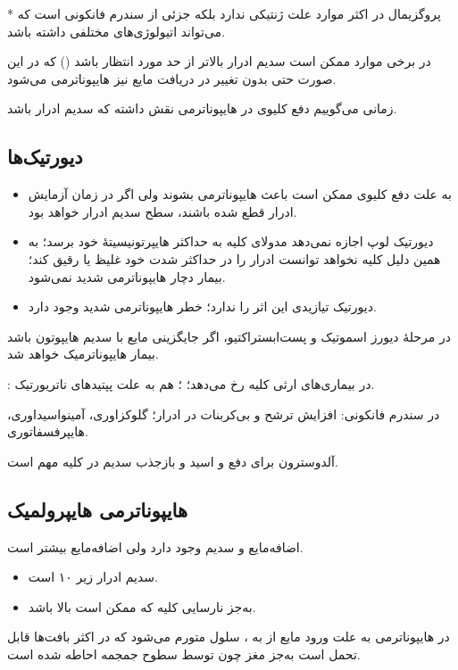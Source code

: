 \documentclass[12pt,a4paper]{article}
\begin{document}
*  پروگزیمال در اکثر موارد علت ژنتیکی ندارد بلکه جزئی از سندرم فانکونی است که می‌تواند اتیولوژی‌های مختلفی داشته باشد.

در برخی موارد ممکن است سدیم ادرار بالاتر از حد مورد انتظار باشد () که در این صورت حتی بدون تغییر در دریافت مایع نیز هایپوناترمی می‌شود.

زمانی می‌گوییم دفع کلیوی در هایپوناترمی نقش داشته که سدیم ادرار  باشد.

\subsection*{دیورتیک‌ها}
\begin{itemize}
\item به علت دفع کلیوی ممکن است باعث هایپوناترمی بشوند ولی اگر در زمان آزمایش ادرار قطع شده باشند، سطح سدیم ادرار  خواهد بود.
\item دیورتیک لوپ اجازه نمی‌دهد مدولای کلیه به حداکثر هایپرتونیسیتهٔ خود برسد؛ به همین دلیل کلیه نخواهد توانست ادرار را در حداکثر شدت خود غلیظ یا رقیق کند؛ بیمار دچار هایپوناترمی شدید نمی‌شود.
\item دیورتیک تیازیدی این اثر را ندارد؛ خطر هایپوناترمی شدید وجود دارد.
\end{itemize}
در مرحلهٔ دیورز اسموتیک و پست‌ابستراکتیو، اگر جایگزینی مایع با سدیم هایپوتون باشد بیمار هایپوناترمیک خواهد شد.

: در بیماری‌های ارثی کلیه رخ می‌دهد؛ ؛  هم به علت پپتیدهای ناتریورتیک.

در سندرم فانکونی: افزایش ترشح  و بی‌کربنات در ادرار؛ گلوکزاوری، آمینواسیداوری، هایپرفسفاتوری.

آلدوسترون برای دفع  و اسید و بازجذب سدیم در کلیه مهم است.

\subsection*{هایپوناترمی هایپرولمیک}
اضافه‌مایع و سدیم وجود دارد ولی اضافه‌مایع بیشتر است.
\begin{itemize}
\item سدیم ادرار زیر ۱۰ است.
\item به‌جز نارسایی کلیه که  ممکن است بالا باشد.
\end{itemize}

در هایپوناترمی به علت ورود مایع از  به ، سلول متورم می‌شود که در اکثر بافت‌ها قابل تحمل است به‌جز مغز چون توسط سطوح جمجمه احاطه شده است.
\end{document}
